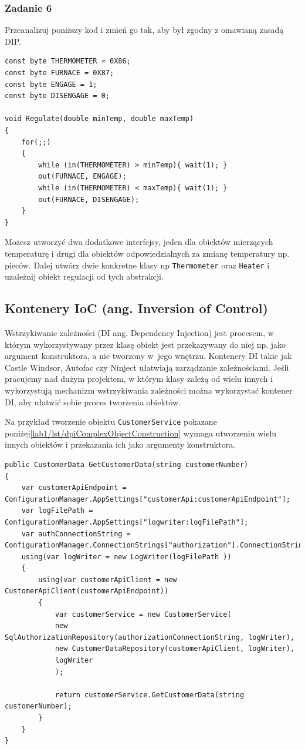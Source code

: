 \subsubsection{Zadanie 6}
Przeanalizuj poniższy kod i zmień go tak, aby był zgodny z omawianą zasadą DIP.
\begin{lstlisting}
const byte THERMOMETER = 0X86;
const byte FURNACE = 0X87;
const byte ENGAGE = 1;
const byte DISENGAGE = 0;

void Regulate(double minTemp, double maxTemp)
{
	for(;;)
	{
		while (in(THERMOMETER) > minTemp){ wait(1); }
		out(FURNACE, ENGAGE);
		while (in(THERMOMETER) < maxTemp){ wait(1); }
		out(FURNACE, DISENGAGE);	
	}
}
\end{lstlisting}

Możesz utworzyć dwa dodatkowe interfejsy, jeden dla obiektów mierzących temperaturę i drugi dla obiektów odpowiedzialnych za zmianę temperatury np. pieców. Dalej utwórz dwie konkretne klasy np \texttt{Thermometer} oraz \texttt{Heater} i uzależnij obiekt regulacji od tych abstrakcji. 

\subsection{Kontenery IoC (ang. Inversion of Control)}
Wstrzykiwanie zależności (DI ang. Dependency Injection) jest procesem, w którym wykorzystywany przez klasę obiekt jest przekazywany do niej np. jako argument konstruktora, a nie tworzony w~jego wnętrzu. Kontenery DI takie jak Castle Windsor, Autofac czy Ninject ułatwiają zarządzanie zależnościami. Jeśli pracujemy nad dużym projektem, w którym klasy zależą od wielu innych i wykorzystują mechanizm wstrzykiwania zależności można wykorzystać kontener DI, aby ułatwić sobie proces tworzenia obiektów. 

Na przykład tworzenie obiektu \texttt{CustomerService} pokazane poniżej\ref{lab1/lst/dpiComplexObjectConstruction} wymaga utworzeniu wielu innych obiektów i przekazania ich jako argumenty konstruktora.
\begin{lstlisting}[caption={Tworzenie obiektu posiadającego zależności wstrzykiwane przez konstruktor }, label={lab1/lst/dpiComplexObjectConstruction}]
public CustomerData GetCustomerData(string customerNumber)
{
	var customerApiEndpoint = ConfigurationManager.AppSettings["customerApi:customerApiEndpoint"];
	var logFilePath = ConfigurationManager.AppSettings["logwriter:logFilePath"];
	var authConnectionString = ConfigurationManager.ConnectionStrings["authorization"].ConnectionString;
	using(var logWriter = new LogWriter(logFilePath ))
	{
		using(var customerApiClient = new CustomerApiClient(customerApiEndpoint))
		{
			var customerService = new CustomerService(
			new SqlAuthorizationRepository(authorizationConnectionString, logWriter),
			new CustomerDataRepository(customerApiClient, logWriter),
			logWriter
			);   
			
			return customerService.GetCustomerData(string customerNumber);
		}
	}
}
\end{lstlisting}

